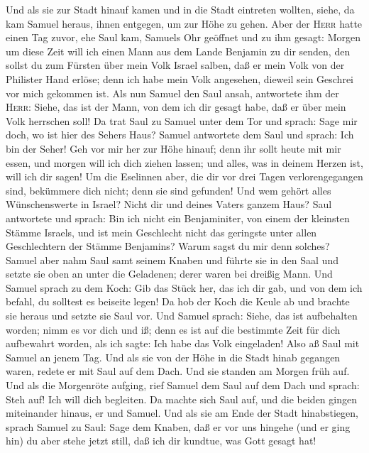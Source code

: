  Und als sie zur Stadt hinauf kamen und in die Stadt
eintreten wollten, siehe, da kam Samuel heraus, ihnen entgegen, um zur
Höhe zu gehen.  Aber der \textsc{Herr} hatte einen Tag
zuvor, ehe Saul kam, Samuels Ohr geöffnet und zu ihm gesagt:
 Morgen um diese Zeit will ich einen Mann aus dem Lande
Benjamin zu dir senden, den sollst du zum Fürsten über mein Volk Israel
salben, daß er mein Volk von der Philister Hand erlöse; denn ich habe
mein Volk angesehen, dieweil sein Geschrei vor mich gekommen ist.
 Als nun Samuel den Saul ansah, antwortete ihm der
\textsc{Herr}: Siehe, das ist der Mann, von dem ich dir gesagt habe, daß
er über mein Volk herrschen soll!  Da trat Saul zu Samuel
unter dem Tor und sprach: Sage mir doch, wo ist hier des Sehers Haus?
 Samuel antwortete dem Saul und sprach: Ich bin der
Seher! Geh vor mir her zur Höhe hinauf; denn ihr sollt heute mit mir
essen, und morgen will ich dich ziehen lassen; und alles, was in deinem
Herzen ist, will ich dir sagen!  Um die Eselinnen aber,
die dir vor drei Tagen verlorengegangen sind, bekümmere dich nicht; denn
sie sind gefunden! Und wem gehört alles Wünschenswerte in Israel? Nicht
dir und deines Vaters ganzem Haus?  Saul antwortete und
sprach: Bin ich nicht ein Benjaminiter, von einem der kleinsten Stämme
Israels, und ist mein Geschlecht nicht das geringste unter allen
Geschlechtern der Stämme Benjamins? Warum sagst du mir denn solches?
 Samuel aber nahm Saul samt seinem Knaben und führte sie
in den Saal und setzte sie oben an unter die Geladenen; derer waren bei
dreißig Mann.  Und Samuel sprach zu dem Koch: Gib das
Stück her, das ich dir gab, und von dem ich befahl, du solltest es
beiseite legen!  Da hob der Koch die Keule ab und brachte
sie heraus und setzte sie Saul vor. Und Samuel sprach: Siehe, das ist
aufbehalten worden; nimm es vor dich und iß; denn es ist auf die
bestimmte Zeit für dich aufbewahrt worden, als ich sagte: Ich habe das
Volk eingeladen! Also aß Saul mit Samuel an jenem Tag. 
Und als sie von der Höhe in die Stadt hinab gegangen waren, redete er
mit Saul auf dem Dach.  Und sie standen am Morgen früh
auf. Und als die Morgenröte aufging, rief Samuel dem Saul auf dem Dach
und sprach: Steh auf! Ich will dich begleiten. Da machte sich Saul auf,
und die beiden gingen miteinander hinaus, er und Samuel. 
Und als sie am Ende der Stadt hinabstiegen, sprach Samuel zu Saul: Sage
dem Knaben, daß er vor uns hingehe (und er ging hin) du aber stehe jetzt
still, daß ich dir kundtue, was Gott gesagt hat!

